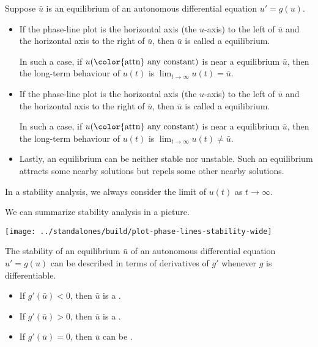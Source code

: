 \documentclass[../main.tex]{subfiles}
\begin{document}
\begin{method} 
  Suppose \(\bar{u}\) is an equilibrium of an autonomous differential equation \(u' = g(u)\). 

  \begin{itemize}
    \item If the phase-line plot is  the horizontal axis (the \(u\)-axis) to the left of \(\bar{u}\) and  the horizontal axis to the right of \(\bar{u}\), then \(\bar{u}\) is called a  equilibrium.

      In such a case, if \(u(\text{\color{attn} any constant})\) is near a  equilibrium \(\bar{u}\), then the long-term behaviour of \(u(t)\) is \(\lim_{t \to \infty} u(t) = \bar{u}\).

      \vspace{1cm}

    \item If the phase-line plot is  the horizontal axis (the \(u\)-axis) to the left of \(\bar{u}\) and  the horizontal axis to the right of \(\bar{u}\), then \(\bar{u}\) is called a  equilibrium.

      In such a case, if \(u(\text{\color{attn} any constant})\) is near a  equilibrium \(\bar{u}\), then the long-term behaviour of \(u(t)\) is \(\lim_{t \to \infty} u(t) \ne \bar{u}\).

      \vspace{1cm}

    \item Lastly, an equilibrium can be neither stable nor unstable. Such an equilibrium attracts some nearby solutions but repels some other nearby solutions.
  \end{itemize}
\end{method}
\faExclamationTriangle{} In a stability analysis, we always consider the limit of \(u(t)\) as \(t \to \infty\).

We can summarize stability analysis in a picture. 
\begin{center}
  \texttt{[image: ../standalones/build/plot-phase-lines-stability-wide]}
\end{center}


The stability of an equilibrium \(\bar{u}\) of an autonomous differential equation \(u' = g(u)\) can be described in terms of derivatives of \(g'\) whenever \(g\) is differentiable.
\begin{itemize}
  \item If \(g'(\bar{u}) < 0\), then \(\bar{u}\) is a \underline{\hspace{4in}}.
  \item If \(g'(\bar{u}) > 0\), then \(\bar{u}\) is a \underline{\hspace{4in}}.
  \item If \(g'(\bar{u}) = 0\), then \(\bar{u}\) can be \underline{\hspace{4in}}.
\end{itemize}
\end{document}
